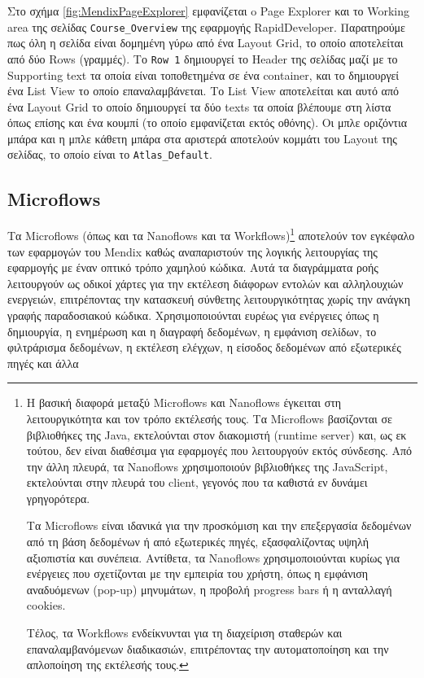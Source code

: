             Στο σχήμα \ref{fig:MendixPageExplorer} εμφανίζεται o Page Explorer και το Working area της σελίδας \verb|Course_Overview| της εφαρμογής RapidDeveloper. Παρατηρούμε πως όλη η σελίδα είναι δομημένη γύρω από ένα Layout Grid, το οποίο αποτελείται από δύο Rows (γραμμές). Το \texttt{Row 1} δημιουργεί το Header της σελίδας μαζί με το Supporting text τα οποία είναι τοποθετημένα σε ένα container, και το  δημιουργεί ένα List View το οποίο επαναλαμβάνεται. Το List View αποτελείται και αυτό από ένα Layout Grid το οποίο δημιουργεί τα δύο texts τα οποία βλέπουμε στη λίστα όπως επίσης και ένα κουμπί (το οποίο εμφανίζεται εκτός οθόνης). Οι μπλε οριζόντια μπάρα και η μπλε κάθετη μπάρα στα αριστερά αποτελούν κομμάτι του Layout της σελίδας, το οποίο είναι το \verb|Atlas_Default|.

        \subsection{Microflows} \label{sec:MendixMicroflows}
            Τα Microflows (όπως και τα Nanoflows και τα Workflows)\footnote{Η βασική διαφορά μεταξύ Microflows και Nanoflows έγκειται στη λειτουργικότητα και τον τρόπο εκτέλεσής τους. Τα Microflows βασίζονται σε βιβλιοθήκες της Java, εκτελούνται στον διακομιστή (runtime server) και, ως εκ τούτου, δεν είναι διαθέσιμα για εφαρμογές που λειτουργούν εκτός σύνδεσης. Από την άλλη πλευρά, τα Nanoflows χρησιμοποιούν βιβλιοθήκες της JavaScript, εκτελούνται στην πλευρά του client, γεγονός που τα καθιστά εν δυνάμει γρηγορότερα.

Τα Microflows είναι ιδανικά για την προσκόμιση και την επεξεργασία δεδομένων από τη βάση δεδομένων ή από εξωτερικές πηγές, εξασφαλίζοντας υψηλή αξιοπιστία και συνέπεια. Αντίθετα, τα Nanoflows χρησιμοποιούνται κυρίως για ενέργειες που σχετίζονται με την εμπειρία του χρήστη, όπως η εμφάνιση αναδυόμενων (pop-up) μηνυμάτων, η προβολή progress bars ή η ανταλλαγή cookies.

Τέλος, τα Workflows ενδείκνυνται για τη διαχείριση σταθερών και επαναλαμβανόμενων διαδικασιών, επιτρέποντας την αυτοματοποίηση και την απλοποίηση της εκτέλεσής τους.} αποτελούν τον εγκέφαλο των εφαρμογών του Mendix καθώς αναπαριστούν της λογικής λειτουργίας της εφαρμογής με έναν οπτικό τρόπο χαμηλού κώδικα. Αυτά τα διαγράμματα ροής λειτουργούν ως οδικοί χάρτες για την εκτέλεση διάφορων εντολών και αλληλουχιών ενεργειών, επιτρέποντας την κατασκευή σύνθετης λειτουργικότητας χωρίς την ανάγκη γραφής παραδοσιακού κώδικα. Χρησιμοποιούνται ευρέως για ενέργειες όπως η δημιουργία, η ενημέρωση και η διαγραφή δεδομένων, η εμφάνιση σελίδων, το φιλτράρισμα δεδομένων, η εκτέλεση ελέγχων, η είσοδος δεδομένων από εξωτερικές πηγές και άλλα


